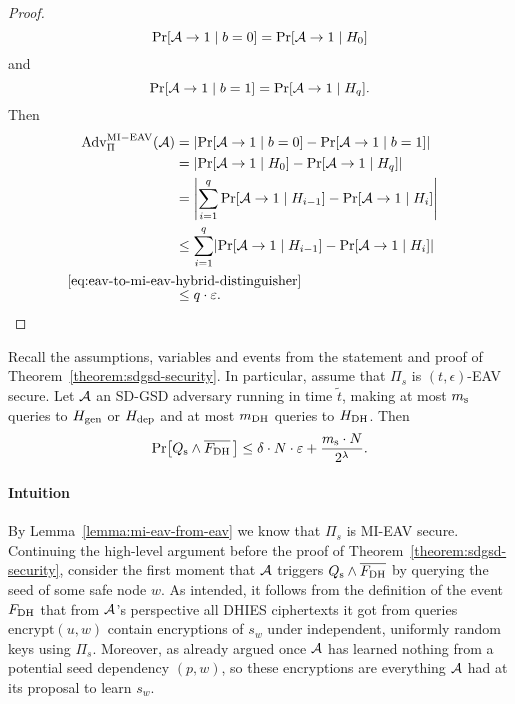 \begin{proof}
	\[
		\pr{\adv \rightarrow 1 \mid b = 0} = \pr{\adv \rightarrow 1 \mid H_0}
	\]
	and
	\[
		\pr{\adv \rightarrow 1 \mid b = 1} = \pr{\adv \rightarrow 1 \mid H_q}.
	\]
	Then
	\begin{align*}
		\mathrm{Adv}_{\Pi}^{\mathrm{MI-EAV}}(\adv) & = \abs*{\pr{\adv \rightarrow 1 \mid b = 0} - \pr{\adv \rightarrow 1 \mid b = 1}}                      \\
		                                           & = \abs*{\pr{\adv \rightarrow 1 \mid H_0} - \pr{\adv \rightarrow 1 \mid H_q}}                          \\
		                                           & = \abs*{\sum_{i = 1}^{q} \pr{\adv \rightarrow 1 \mid H_{i - 1}} - \pr{\adv \rightarrow 1 \mid H_i}}   \\
		                                           & \le \sum_{i = 1}^{q} \abs*{\pr{\adv \rightarrow 1 \mid H_{i - 1}} - \pr{\adv \rightarrow 1 \mid H_i}} \\
		                                           & \stackrel{\mathclap{\eqref{eq:eav-to-mi-eav-hybrid-distinguisher}}}{\le} q \cdot \epsilon.
	\end{align*}
\end{proof}

\begin{lemma} \label{lemma:eav-reduction}
	Recall the assumptions, variables and events from the statement and proof of Theorem~\ref{theorem:sdgsd-security}. In particular, assume that $\Pi_s$ is $(t, \epsilon)$-EAV secure. Let $\mathcal{A}$ an SD-GSD adversary running in time $\tilde{t}$, making at most $m_\mathrm{s}$ queries to $H_\mathrm{gen}$ or $H_\mathrm{dep}$ and at most $m_\mathrm{DH}$ queries to $H_\mathrm{DH}$. Then
	\[
		\pr{\qs \land \overline{\fdh}\,} \le \delta \cdot N \cdot \epsilon + \frac{\ms \cdot N}{2^\lambda}.
	\]
\end{lemma}

\paragraph{Intuition} By Lemma~\vref{lemma:mi-eav-from-eav} we know that $\Pi_s$ is MI-EAV secure. Continuing the high-level argument before the proof of Theorem~\ref{theorem:sdgsd-security}, consider the first moment that $\mathcal{A}$ triggers $Q_\mathrm{s} \land \overline{F_\mathrm{DH}}$ by querying the seed of some safe node $w$.  As intended, it follows from the definition of the event $F_\mathrm{DH}$ that from $\mathcal{A}$'s perspective all DHIES ciphertexts it got from queries $\mathrm{encrypt}(u, w)$ contain encryptions of $s_w$ under independent, uniformly random keys using $\Pi_s$. Moreover, as already argued once $\mathcal{A}$ has learned nothing from a potential seed dependency $(p, w)$, so these encryptions are everything $\mathcal{A}$ had at its proposal to learn $s_w$.

